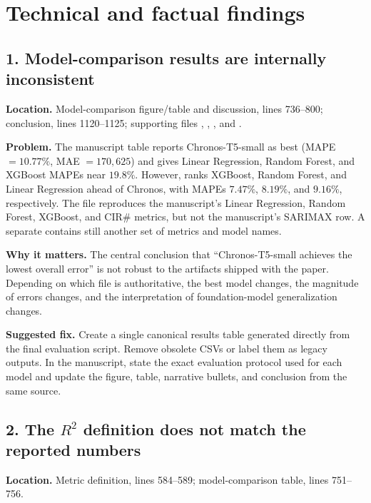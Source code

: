 \documentclass[11pt]{article}
\begin{document}
\section*{Technical and factual findings}

\subsection*{1. Model-comparison results are internally inconsistent}

\textbf{Location.} Model-comparison figure/table and discussion, lines 736--800; conclusion, lines 1120--1125; supporting files , , , and .

\textbf{Problem.} The manuscript table reports Chronos-T5-small as best (MAPE \(=10.77\%\), MAE \(=170{,}625\)) and gives Linear Regression, Random Forest, and XGBoost MAPEs near \(19.8\%\). However,  ranks XGBoost, Random Forest, and Linear Regression ahead of Chronos, with MAPEs \(7.47\%\), \(8.19\%\), and \(9.16\%\), respectively. The file  reproduces the manuscript's Linear Regression, Random Forest, XGBoost, and CIR\# metrics, but not the manuscript's SARIMAX row. A separate  contains still another set of metrics and model names.

\textbf{Why it matters.} The central conclusion that ``Chronos-T5-small achieves the lowest overall error'' is not robust to the artifacts shipped with the paper. Depending on which file is authoritative, the best model changes, the magnitude of errors changes, and the interpretation of foundation-model generalization changes.

\textbf{Suggested fix.} Create a single canonical results table generated directly from the final evaluation script. Remove obsolete CSVs or label them as legacy outputs. In the manuscript, state the exact evaluation protocol used for each model and update the figure, table, narrative bullets, and conclusion from the same source.

\subsection*{2. The \(R^2\) definition does not match the reported numbers}

\textbf{Location.} Metric definition, lines 584--589; model-comparison table, lines 751--756.
\end{document}
